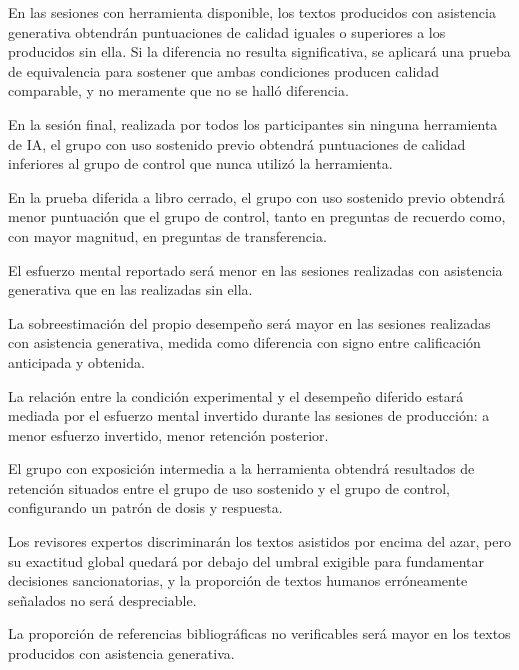 \documentclass[12pt,a4paper,openany]{report}
\begin{document}
    \begin{description}[leftmargin=1.4cm,style=nextline,font=\bfseries\sffamily]
        \item[H1.] En las sesiones con herramienta disponible, los textos producidos con asistencia generativa obtendr\'an puntuaciones de calidad iguales o superiores a los producidos sin ella. Si la diferencia no resulta significativa, se aplicar\'a una prueba de equivalencia para sostener que ambas condiciones producen calidad comparable, y no meramente que no se hall\'o diferencia.
        \item[H2.] En la sesi\'on final, realizada por todos los participantes sin ninguna herramienta de IA, el grupo con uso sostenido previo obtendr\'a puntuaciones de calidad inferiores al grupo de control que nunca utiliz\'o la herramienta.
        \item[H3.] En la prueba diferida a libro cerrado, el grupo con uso sostenido previo obtendr\'a menor puntuaci\'on que el grupo de control, tanto en preguntas de recuerdo como, con mayor magnitud, en preguntas de transferencia.
        \item[H4.] El esfuerzo mental reportado ser\'a menor en las sesiones realizadas con asistencia generativa que en las realizadas sin ella.
        \item[H5.] La sobreestimaci\'on del propio desempe\~no ser\'a mayor en las sesiones realizadas con asistencia generativa, medida como diferencia con signo entre calificaci\'on anticipada y obtenida.
        \item[H6.] La relaci\'on entre la condici\'on experimental y el desempe\~no diferido estar\'a mediada por el esfuerzo mental invertido durante las sesiones de producci\'on: a menor esfuerzo invertido, menor retenci\'on posterior.
        \item[H7.] El grupo con exposici\'on intermedia a la herramienta obtendr\'a resultados de retenci\'on situados entre el grupo de uso sostenido y el grupo de control, configurando un patr\'on de dosis y respuesta.
        \item[H8.] Los revisores expertos discriminar\'an los textos asistidos por encima del azar, pero su exactitud global quedar\'a por debajo del umbral exigible para fundamentar decisiones sancionatorias, y la proporci\'on de textos humanos err\'oneamente se\~nalados no ser\'a despreciable.
        \item[H9.] La proporci\'on de referencias bibliogr\'aficas no verificables ser\'a mayor en los textos producidos con asistencia generativa.
    \end{description}
    
\end{document}

